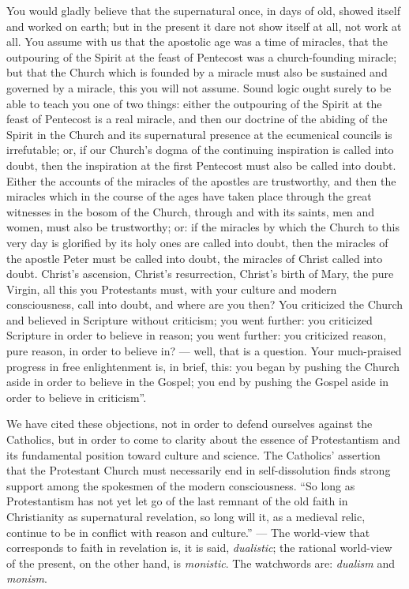 \documentclass[12pt,a4paper,openany]{book}
\newcommand{\opage}[1]{\marginnote{\footnotesize\textit{[#1]}}}
\begin{document}
You would gladly believe that the supernatural once,
in days of old, showed itself and worked on earth;
but in the present it dare not show itself at all, not work at all.
You assume with us that the apostolic age was a time of
miracles, that the outpouring of the Spirit at the feast of Pentecost was a
church-founding miracle; but that the Church which is founded
\setcounter{footnote}{0}%
\opage{63}by a miracle must also be sustained and governed by a
miracle, this you will not assume. Sound logic ought surely to
be able to teach you one of two things: either the outpouring of the Spirit
at the feast of Pentecost is a real miracle, and then
our doctrine of the abiding of the Spirit in the Church and its supernatural
presence at the ecumenical councils is
irrefutable; or, if our Church's dogma of
the continuing inspiration is called into doubt, then
the inspiration at the first Pentecost must also be called into
doubt. Either the accounts of the miracles of the apostles are
trustworthy, and then the miracles which in the course of
the ages have taken place through the great witnesses in the bosom of the Church,
through and with its saints, men and women, must also be
trustworthy; or: if the miracles by which the Church
to this very day is glorified by its holy ones are
called into doubt, then the miracles of the apostle Peter must be
called into doubt, the miracles of Christ called into doubt. Christ's
ascension, Christ's resurrection, Christ's birth of Mary,
the pure Virgin, all this you Protestants must, with
your culture and modern consciousness, call into doubt, and
where are you then? You criticized the Church and believed in
Scripture without criticism; you went further: you criticized Scripture
in order to believe in reason; you went further: you criticized
reason, pure reason, in order to believe in?
--- well, that is a question. Your much-praised progress
in free enlightenment is, in brief, this: you began
by pushing the Church aside in order to believe in the Gospel;
you end by pushing the Gospel aside in order to
believe in criticism''.

We have cited these objections, not in order
to defend ourselves against the Catholics, but in order to come to
clarity about the essence of Protestantism and its fundamental
\setcounter{footnote}{0}%
\opage{64}position toward culture and science. The Catholics' assertion
that the Protestant Church must necessarily end
in self-dissolution finds strong support among the spokesmen of
the modern consciousness. ``So long as Protestantism
has not yet let go of the last remnant of
the old faith in Christianity as supernatural
revelation, so long will it, as a medieval
relic, continue to be in conflict with reason and culture.''
--- The world-view that corresponds to faith in revelation
is, it is said, \emph{dualistic}; the rational world-view of the present,
on the other hand, is \emph{monistic}.
The watchwords are: \emph{dualism} and \emph{monism}.
\end{document}
